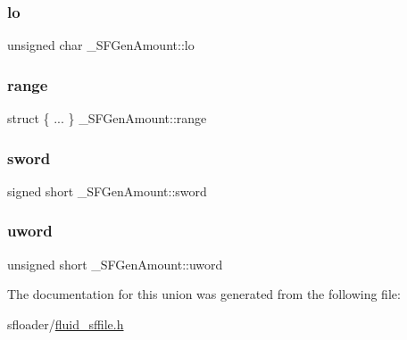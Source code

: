 \subsubsection{\texorpdfstring{lo}{lo}}
{\footnotesize\ttfamily unsigned char \+\_\+\+S\+F\+Gen\+Amount\+::lo}

\mbox{\label{union__SFGenAmount_ac7aa41e4e3bc575e4b18f76382df1171}} 
\subsubsection{\texorpdfstring{range}{range}}
{\footnotesize\ttfamily struct \{ ... \}   \+\_\+\+S\+F\+Gen\+Amount\+::range}

\mbox{\label{union__SFGenAmount_a0ec8e03ee604c20f645b9c13b6372ffe}} 
\subsubsection{\texorpdfstring{sword}{sword}}
{\footnotesize\ttfamily signed short \+\_\+\+S\+F\+Gen\+Amount\+::sword}

\mbox{\label{union__SFGenAmount_a07f5584e6af8e7a5e50a07fcc54d7e06}} 
\subsubsection{\texorpdfstring{uword}{uword}}
{\footnotesize\ttfamily unsigned short \+\_\+\+S\+F\+Gen\+Amount\+::uword}



The documentation for this union was generated from the following file\+:\begin{DoxyCompactItemize}
\item 
sfloader/\hyperlink{fluid__sffile_8h}{fluid\+\_\+sffile.\+h}\end{DoxyCompactItemize}
